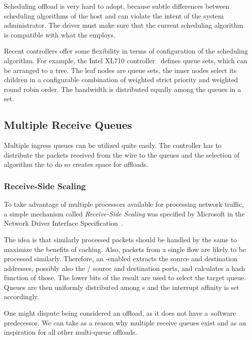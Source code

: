 Scheduling offload is very hard to adopt, because subtle differences between
scheduling algorithms of the host and  can violate the intent of the
system administrator. The  driver must make sure that the current
scheduling algorithm is compatible with what the  employs.

Recent controllers offer some flexibility in terms of configuration of the
scheduling algorithm. For example, the Intel XL710 controller~\cite{XL710}
defines queue sets, which can be arranged to a tree. The leaf nodes are queue sets,
the inner nodes select its children in a configurable combination of weighted
strict priority and weighted round robin order. The bandwidth is distributed
equally among the queues in a set.

\subsection{Multiple Receive Queues}

Multiple ingress queues can be utilized quite
easily. The controller has to distribute the packets received from the wire to
the queues and the selection of algorithm the to do so creates space for offloads.

\subsubsection{Receive-Side Scaling}

To take advantage of multiple processors available for processing
network traffic, a simple mechanism called \emph{Receive-Side Scaling} was
specified by Microsoft in the Network Driver Interface Specification~\cite{NDIS}.

The idea is that similarly processed packets should be handled by the same
 to maximize the benefits of caching. Also, packets from a single flow are
likely to be processed similarly. Therefore, an -enabled 
extracts the source and destination addresses, possibly also the /
source and destination ports, and calculates a hash function of those. The lower
bits of the result are used to select the target queue. Queues are then uniformly
distributed among s and the interrupt affinity is set accordingly.

One might dispute  being considered an offload, as it does not have
a~software predecessor. We can take  as a reason why multiple receive queues
exist and as an inspiration for all other multi-queue offloads.

